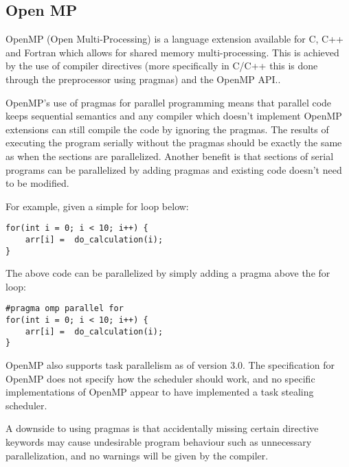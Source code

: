 \subsection{Open MP}

OpenMP (Open Multi-Processing) is a language extension available for C, C++ and Fortran which allows for shared memory multi-processing. 
This is achieved by the use of compiler directives (more specifically in C/C++ this is done through the preprocessor using pragmas) and
the OpenMP API.\cite{openmp}.

OpenMP's use of pragmas for parallel programming means that parallel code keeps sequential semantics
and any compiler which doesn't implement OpenMP extensions can still compile the code by ignoring the pragmas.
The results of executing the program serially without the pragmas should be exactly the same as when
the sections are parallelized. Another benefit is that sections of serial programs can be
parallelized by adding pragmas and existing code doesn't need to be modified.

For example, given a simple for loop below:

\begin{lstlisting}[style=myGPC]
for(int i = 0; i < 10; i++) {
    arr[i] =  do_calculation(i);
}
\end{lstlisting}

The above code can be parallelized by simply adding a pragma above
the for loop:

\begin{lstlisting}[style=myGPC] 
#pragma omp parallel for
for(int i = 0; i < 10; i++) {
    arr[i] =  do_calculation(i);
}
\end{lstlisting}

OpenMP also supports task parallelism as of version 3.0\cite{openmp3}. The specification for OpenMP
does not specify how the scheduler should work, and no specific implementations of OpenMP appear to have 
implemented a task stealing scheduler.

A downside to using pragmas is that accidentally missing certain directive keywords may cause undesirable 
program behaviour such as unnecessary parallelization\cite{openmptraps}, and no warnings will be given by the compiler.

 
